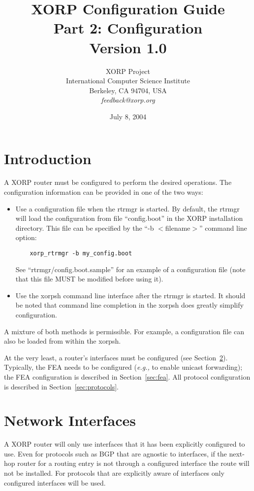 \documentclass[11pt]{article}
\title{XORP Configuration Guide \\
Part 2: Configuration \\
\vspace{1ex}
Version 1.0}
\author{ XORP Project                                   \\
         International Computer Science Institute       \\
         Berkeley, CA 94704, USA                        \\
         {\it feedback@xorp.org}
}
\date{July 8, 2004}
\newcommand{\eg}{\emph{e.g.,}\xspace}
\begin{document}
\maketitle

\section{Introduction}

A XORP router must be configured to perform the desired operations.
The configuration information can be provided in one of the two ways:

\begin{itemize}
\item
  Use a configuration file when the rtrmgr is started.
  By default, the rtrmgr will load the configuration from file
  ``config.boot'' in the XORP installation directory.
  This file can be specified by the ``-b $<$filename$>$'' command line
  option:
\begin{verbatim}
    xorp_rtrmgr -b my_config.boot
\end{verbatim}

    See ``rtrmgr/config.boot.sample'' for an example of a
    configuration file (note that this file MUST be modified
    before using it).

\item
  Use the xorpsh command line interface after the rtrmgr is started.
  It should be noted that command line completion in the xorpsh
  does greatly simplify configuration.
\end{itemize}

A mixture of both methods is permissible. For example,
a configuration file can also be loaded from within the xorpsh.

At the very least, a router's interfaces must be configured (see
Section~\ref{sec:network_interfaces}). Typically, the FEA needs to be
configured (\eg to enable unicast forwarding); the FEA configuration is
described in Section~\ref{sec:fea}. All protocol configuration is
described in Section~\ref{sec:protocols}.

\section{Network Interfaces}
\label{sec:network_interfaces}

A XORP router will only use interfaces that it has been explicitly
configured to use. Even for protocols such as BGP that are agnostic to
interfaces, if the next-hop router for a routing entry is not through
a configured interface the route will not be installed. For protocols
that are explicitly aware of interfaces only configured interfaces
will be used.
\end{document}
